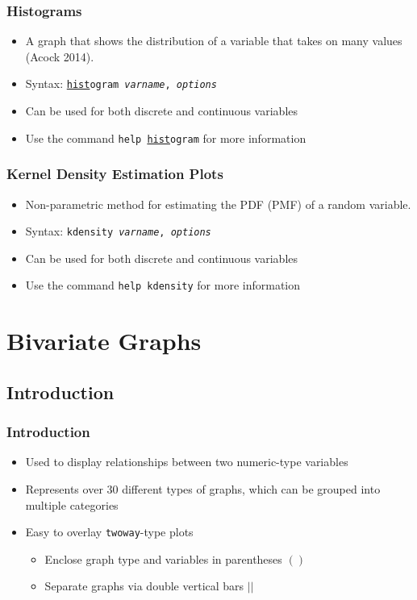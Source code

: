 \documentclass{beamer}
\begin{document}
\begin{frame}
	\frametitle{Histograms}
		\begin{itemize}
			\item A graph that shows the distribution of a variable that takes on many values (Acock 2014).
			\item Syntax: \texttt{\underline{hist}ogram \textit{varname}, \textit{options}}
			\item Can be used for both discrete and continuous variables
			\item Use the command \texttt{help \underline{hist}ogram} for more information
		\end{itemize}
\end{frame}

\begin{frame}
	\frametitle{Kernel Density Estimation Plots}
		\begin{itemize}
			\item Non-parametric method for estimating the PDF (PMF) of a random variable.
			\item Syntax: \texttt{kdensity \textit{varname}, \textit{options}}
			\item Can be used for both discrete and continuous variables
			\item Use the command \texttt{help kdensity} for more information
		\end{itemize}
\end{frame}

\section{Bivariate Graphs}
\subsection{Introduction}

\begin{frame}
	\frametitle{Introduction}
		\begin{itemize}
			\item Used to display relationships between two numeric-type variables
			\item Represents over 30 different types of graphs, which can be grouped into multiple categories
			\item Easy to overlay \texttt{twoway}-type plots
				\begin{itemize}
					\item Enclose graph type and variables in parentheses $()$
					\item Separate graphs via double vertical bars $||$
				\end{itemize}
		\end{itemize}
\end{frame}
\end{document}
